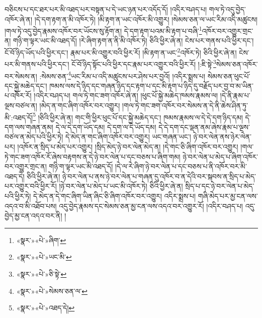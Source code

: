 བཅིངས་པ་དང་ཐར་པར་མི་འཐད་པར་བསྟན་པ་དེ་ཡང་ཉན་པར་འདོད་དོ། །འདིར་བཤད་པ། གལ་ཏེ་འདུ་བྱེད་འཁོར་ཞེ་ན། །དེ་དག་རྟག་ན་མི་འཁོར་ཏེ། །མི་རྟག་ན་ཡང་འཁོར་མི་འགྱུར། །སེམས་ཅན་ལ་ཡང་རིམ་འདི་མཚུངས། །གལ་ཏེ་འདུ་བྱེད་རྣམས་འཁོར་བར་ཡོངས་སུ་རྟོག་ན། དེ་དག་རྟག་པའམ་མི་རྟག་པ་བཞི་\footnote{«སྣར་»«པེ་»ཞིག་}འཁོར་བར་འགྱུར་གྲང་ན། གཉི་ག་ལྟར་ཡང་མི་འཐད་དོ། །རེ་ཞིག་རྟག་ན་ནི་མི་འཁོར་ཏེ། ཅིའི་ཕྱིར་ཞེ་ན། ངེས་པར་གནས་པའི་ཕྱིར་དང་། ངོ་བོ་ཉིད་ཡོད་པའི་ཕྱིར་དང་། རྣམ་པར་མི་འགྱུར་བའི་ཕྱིར་རོ། །མི་རྟག་ན་ཡང་\footnote{«སྣར་»«པེ་»ཡང་མི་}འཁོར་ཏེ། ཅིའི་ཕྱིར་ཞེ་ན། ངེས་པར་མི་གནས་པའི་ཕྱིར་དང་། ངོ་བོ་ཉིད་སྟོང་པའི་ཕྱིར་དང་རྣམ་པར་འགྱུར་བའི་ཕྱིར་རོ། །:ཇི་སྟེ་\footnote{«སྣར་»«པེ་»ཅི་སྟེ་}སེམས་ཅན་འཁོར་བར་སེམས་ན། :སེམས་ཅན་\footnote{«སྣར་»«པེ་»སེམས་ཅན་ལ་}ཡང་རིམ་པ་འདི་མཚུངས་པར་ཤེས་པར་བྱའོ། །འདིར་སྨྲས་པ། སེམས་ཅན་ཕུང་པོ་དང་སྐྱེ་མཆེད་དང་། ཁམས་ལས་དེ་ཉིད་དང་གཞན་ཉིད་དང་རྟག་པ་དང་མི་རྟག་པ་ཉིད་དུ་བརྗོད་པར་བྱ་བ་མ་ཡིན་པ་འཁོར་རོ། །འདིར་བཤད་པ། གལ་ཏེ་གང་ཟག་འཁོར་ཞེ་ན། །ཕུང་པོ་སྐྱེ་མཆེད་ཁམས་རྣམས་ལ། །དེ་ནི་རྣམ་པ་ལྔས་བཙལ་ན། །མེད་ན་གང་ཞིག་འཁོར་བར་འགྱུར། །གལ་ཏེ་གང་ཟག་འཁོར་བར་སེམས་ན་དེ་ནི་ཆེས་ཤིན་ཏུ་མི་:འཐད་དོ།\footnote{«སྣར་»«པེ་»འཐད་དེ།} །ཅིའི་ཕྱིར་ཞེ་ན། གང་གི་ཕྱིར་ཕུང་པོ་དང་སྐྱེ་མཆེད་དང་། ཁམས་རྣམས་ལ་དེ་དེ་དག་ཉིད་དམ། དེ་དག་ལས་གཞན་ནམ། དེ་ལ་དེ་དག་ཡོད་དམ། དེ་དག་ལ་དེ་ཡོད་དམ། དེ་དེ་དག་དང་ལྡན་ནམ་ཞེས་རྣམ་པ་ལྔས་བཙལ་ན་མེད་པའི་ཕྱིར་ཏེ། དེ་མེད་ན་གང་ཞིག་འཁོར་བར་འགྱུར། ཡང་གཞན་ཡང་། ཉེ་བར་ལེན་ནས་ཉེར་ལེན་པར། །འཁོར་ན་སྲིད་པ་མེད་པར་འགྱུར། །སྲིད་མེད་ཉེ་བར་ལེན་མེད་ན། །དེ་གང་ཅི་ཞིག་འཁོར་བར་འགྱུར། །གལ་ཏེ་གང་ཟག་འཁོར་རོ་ཞེས་བརྟགས་ན་དེ་ཉེ་བར་ལེན་པ་དང་བཅས་པ་ཞིག་གམ། ཉེ་བར་ལེན་པ་མེད་པ་ཞིག་འཁོར་བར་འགྱུར་གྲང་ན། གཉི་ག་ལྟར་ཡང་མི་འཐད་དོ། །དེ་ལ་རེ་ཞིག་ཉེ་བར་ལེན་པ་དང་བཅས་པ་ནི་འཁོར་བར་མི་འཐད་དེ། ཅིའི་ཕྱིར་ཞེ་ན། ཉེ་བར་ལེན་པ་ནས་ཉེ་བར་ལེན་པ་གཞན་དུ་འཁོར་བ་ན་དེའི་བར་སྐབས་ན་སྲིད་པ་མེད་པར་འགྱུར་བའི་ཕྱིར་རོ། །ཉེ་བར་ལེན་པ་མེད་པ་ཡང་མི་འཁོར་ཏེ། ཅིའི་ཕྱིར་ཞེ་ན། སྲིད་པ་དང་ཉེ་བར་ལེན་པ་མེད་པའི་ཕྱིར་ཏེ། དེ་མེད་ན་དེ་གང་ཞིག་ཡིན་ཞིང་ཅི་ཞིག་འཁོར་བར་འགྱུར། འདིར་སྨྲས་པ། གཞི་མེད་པར་མྱ་ངན་ལས་འདའ་བ་མི་འཐོབ་པས། འདུ་བྱེད་རྣམས་དང་སེམས་ཅན་མྱ་ངན་ལས་འདའ་བར་འགྱུར་རོ། །འདིར་བཤད་པ། འདུ་བྱེད་མྱ་ངན་འདའ་བར་ནི། །
